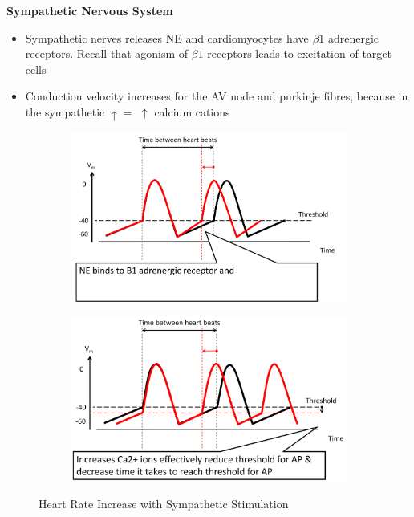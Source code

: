 \documentclass[11pt,fleqn]{book}
\begin{document}
\textbf{Sympathetic
Nervous System}
\begin{itemize}
    \item Sympathetic nerves releases NE and
cardiomyocytes have $\beta1$ adrenergic receptors.
Recall that agonism of $\beta1$ receptors leads to
excitation of target cells
    \item Conduction velocity increases for the AV node and purkinje fibres, because in the sympathetic $\uparrow=$ $\uparrow$ calcium cations
\end{itemize}

\begin{figure}[h!]
    \centering
    \begin{subfigure}{0.45\textwidth}
        \includegraphics[width=\textwidth]{Pictures/Screenshot 2024-04-04 012102.png}
    \end{subfigure}
    \hfill
    \begin{subfigure}{0.45\textwidth}
        \includegraphics[width=\textwidth]{Pictures/Screenshot 2024-04-04 012129.png}
    \end{subfigure}
    \caption{Heart Rate Increase with
Sympathetic Stimulation}
\end{figure}
\end{document}
